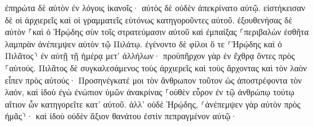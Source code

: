 \documentclass{openreader}
\begin{document}
ἐπηρώτα δὲ αὐτὸν ἐν λόγοις ἱκανοῖς· αὐτὸς δὲ οὐδὲν ἀπεκρίνατο αὐτῷ. 
εἱστήκεισαν δὲ οἱ ἀρχιερεῖς καὶ οἱ γραμματεῖς εὐτόνως κατηγοροῦντες αὐτοῦ. 
ἐξουθενήσας δὲ αὐτὸν ⸀καὶ ὁ Ἡρῴδης σὺν τοῖς στρατεύμασιν αὐτοῦ καὶ ἐμπαίξας ⸀περιβαλὼν ἐσθῆτα λαμπρὰν ἀνέπεμψεν αὐτὸν τῷ Πιλάτῳ. 
ἐγένοντο δὲ φίλοι ὅ τε ⸂Ἡρῴδης καὶ ὁ Πιλᾶτος⸃ ἐν αὐτῇ τῇ ἡμέρᾳ μετ’ ἀλλήλων· προϋπῆρχον γὰρ ἐν ἔχθρᾳ ὄντες πρὸς ⸀αὑτούς. 
Πιλᾶτος δὲ συγκαλεσάμενος τοὺς ἀρχιερεῖς καὶ τοὺς ἄρχοντας καὶ τὸν λαὸν 
εἶπεν πρὸς αὐτούς· Προσηνέγκατέ μοι τὸν ἄνθρωπον τοῦτον ὡς ἀποστρέφοντα τὸν λαόν, καὶ ἰδοὺ ἐγὼ ἐνώπιον ὑμῶν ἀνακρίνας ⸀οὐθὲν εὗρον ἐν τῷ ἀνθρώπῳ τούτῳ αἴτιον ὧν κατηγορεῖτε κατ’ αὐτοῦ. 
ἀλλ’ οὐδὲ Ἡρῴδης, ⸂ἀνέπεμψεν γὰρ αὐτὸν πρὸς ἡμᾶς⸃· καὶ ἰδοὺ οὐδὲν ἄξιον θανάτου ἐστὶν πεπραγμένον αὐτῷ· 
\end{document}

